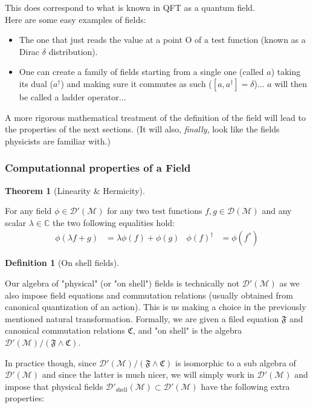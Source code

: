 \documentclass[a4paper,11pt]{article}
\numberwithin{equation}{section}
\theoremstyle{definition}
\newtheorem{definition}{Definition}
\newtheorem{theorem}{Theorem}
\begin{document}
This does correspond to what is known in QFT as a quantum field.\\

Here are some easy examples of fields:
\begin{itemize}
    \item The one that just reads the value at a point O of a test function (known as a Dirac $\delta$ distribution).
    \item One can create a family of fields starting from a single one (called $a$) taking its dual ($a^\dag$) and making sure it commutes as such ($[a,a^\dag]=\delta$)... $a$ will then be called a ladder operator...
\end{itemize}

A more rigorous mathematical treatment of the definition of the field will lead to the properties of the next sections. (It will also, \emph{finally}, look like the fields physicists are familiar with.)

\subsubsection{Computationnal properties of a Field}
        \begin{theorem}[Linearity \& Hermicity]$\quad$
        
         For any field $\phi\in\mathcal{D}'(\mathcal{M})$ for any two test functions $f,g\in\mathcal{D}(\mathcal{M})$ and any scalar $\lambda\in\mathbb{C}$  the two following equalities hold:
         \begin{align*}
             \phi(\lambda f+ g) &= \lambda\phi(f)+ \phi(g)&
             \phi(f)^\dag &= \phi(f^*)
         \end{align*}
        \end{theorem}
        \begin{definition}[On shell fields]$\quad$

        Our algebra of "physical" (or "on shell") fields is technically not $\mathcal{D}'(\mathcal{M})$ as we also impose field equations and commutation relations (usually obtained from canonical quantization of an action). This is us making a choice in the previously mentioned natural transformation. Formally, we are given a filed equation $\mathfrak{F}$ and canonical commutation relations $\mathfrak{C}$, and "on shell" is the algebra $\mathcal{D}'(\mathcal{M})/(\mathfrak{F}\wedge\mathfrak{C})$.

        In practice though, since $\mathcal{D}'(\mathcal{M})/(\mathfrak{F}\wedge\mathfrak{C})$ is isomorphic to a sub algebra of $\mathcal{D}'(\mathcal{M})$ and since the latter is much nicer, we will simply work in $\mathcal{D}'(\mathcal{M})$ and impose that physical fields $\mathcal{D}'_\mathrm{shell}(\mathcal{M})\subset\mathcal{D}'(\mathcal{M})$ have the following extra properties:
        \end{definition}
        
\end{document}
